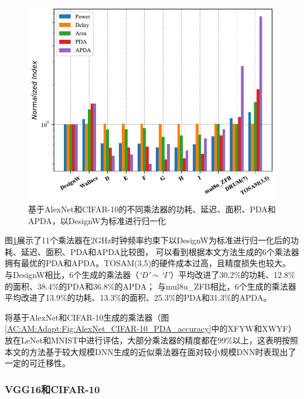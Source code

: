 \begin{figure}[!htb]
    \centering
    \includegraphics[width=0.9\linewidth]{figs/AC-AM-Adapt-AlexNet_CIFAR-10_hist.pdf}
    \caption{基于AlexNet和CIFAR-10的不同乘法器的功耗、延迟、面积、PDA和APDA，以DesignW为标准进行归一化}
    \label{AC:AM:Adapt:Fig:ALexNet_CIFAR-10_hist}
\end{figure}

图\ref{AC:AM:Adapt:Fig:ALexNet_CIFAR-10_hist}展示了11个乘法器在2GHz时钟频率约束下以DesignW为标准进行归一化后的功耗、延迟、面积、PDA和APDA比较图，
可以看到根据本文方法生成的6个乘法器拥有最优的PDA和APDA。TOSAM(3,5)的硬件成本过高，且精度损失也较大。
与DesignW相比，6个生成的乘法器（$\emph{`D'} \sim \emph{`I'}$）平均改进了30.2\%的功耗、12.8\%的面积、38.4\%的PDA和36.8\%的APDA；
与mul8u\_ZFB相比，6个生成的乘法器平均改进了13.9\%的功耗、13.3\%的面积、25.3\%的PDA和31.3\%的APDA。

将基于AlexNet和CIFAR-10生成的乘法器（图\ref{AC:AM:Adapt:Fig:AlexNet_CIFAR-10_PDA_accuracy}中的XFYW和XWYF）放在LeNet和MNIST中进行评估，大部分乘法器的精度都在99\%以上，这表明按照本文的方法基于较大规模DNN生成的近似乘法器在面对较小规模DNN时表现出了一定的可迁移性。


\subsubsection{VGG16和CIFAR-10}

